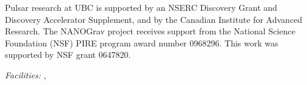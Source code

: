 \documentclass[12pt,preprint]{aastex}
\begin{document}




\acknowledgements
Pulsar research at UBC is supported by an NSERC Discovery Grant and Discovery
Accelerator Supplement, and by the Canadian Institute for Advanced Research.
The NANOGrav project receives support from the National Science Foundation
(NSF) PIRE program award number 0968296. 
This work was supported by NSF grant 0647820.


{\it Facilities:}
, 

%



\end{document}

